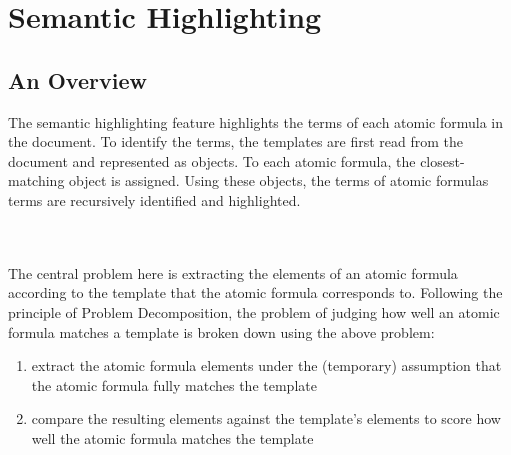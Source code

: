 \documentclass[../main.tex]{subfiles}
\begin{document}
%
%
%
\section{Semantic Highlighting}
\subsection{An Overview}
The semantic highlighting feature highlights the terms of each atomic formula in the document. To identify the terms, the templates are first read from the document and represented as  objects. To each atomic formula, the closest-matching  object is assigned. Using these  objects, the terms of atomic formulas terms are recursively identified and highlighted.


\\
\\
The central problem here is extracting the elements of an atomic formula according to the template that the atomic formula corresponds to. 
Following the principle of Problem Decomposition, the problem of judging how well an atomic formula matches a template is broken down using the above problem:
\begin{enumerate}
    \item extract the atomic formula elements under the (temporary) assumption that the atomic formula fully matches the template
    \item compare the resulting elements against the template's elements to score how well the atomic formula matches the template
\end{enumerate}
\end{document}
